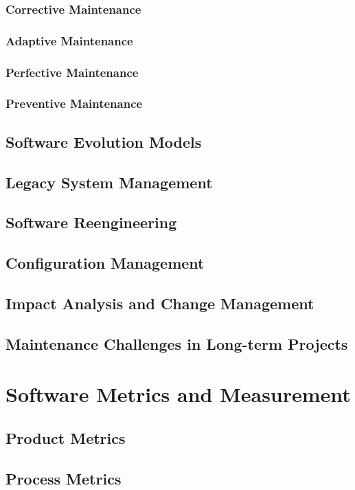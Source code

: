 \begin{refsection}
\subsubsection{Corrective Maintenance}
\subsubsection{Adaptive Maintenance}
\subsubsection{Perfective Maintenance}
\subsubsection{Preventive Maintenance}
\subsection{Software Evolution Models}
\subsection{Legacy System Management}
\subsection{Software Reengineering}
\subsection{Configuration Management}
\subsection{Impact Analysis and Change Management}
\subsection{Maintenance Challenges in Long-term Projects}

\newpage

\section{Software Metrics and Measurement}
\subsection{Product Metrics}
\subsection{Process Metrics}

\end{refsection}
